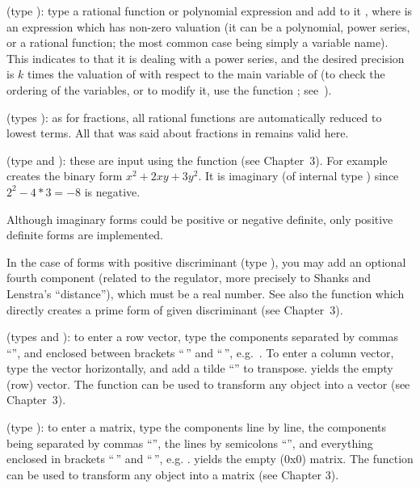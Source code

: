 \label{se:series}
(type ): type a rational function or
polynomial expression and add to it \hbox{},
where  is an expression which has non-zero valuation (it can be a
polynomial, power series, or a rational function; the most common case being
simply a variable name).
This indicates to  that it is dealing with a power series, and the desired
precision is $k$ times the valuation of  with respect to the
main variable of  (to check the ordering of the variables, or
to modify it, use the function ; see~).

(types ): as for fractions, all rational
functions are automatically reduced to lowest terms. All that was
said about fractions in  remains valid here.

%
(type  and ):
these are input using the function  (see Chapter~3). For example
 creates the binary form $x^2+2xy+3y^2$. It is imaginary (of
internal type ) since $2^2 - 4*3 = -8$ is negative.

Although imaginary forms could be positive or negative definite, only
positive definite forms are implemented.

In the case of forms with positive discriminant (type ), you may add
an optional fourth component (related to the regulator, more precisely to
Shanks and Lenstra's ``distance''), which must be a real number. See also the
function  which directly creates a prime form of given
discriminant (see Chapter~3).

 (types
 and ): to enter a row vector, type the components
separated by commas ``\kbd{,}'', and enclosed between brackets
``\kbd{[}$\,$'' and ``$\,$\kbd{]}'', e.g.~\kbd{[1,2,3]}. To enter a column
vector, type the vector horizontally, and add a tilde ``\til'' to transpose.
\kbd{[ ]} yields the empty (row) vector. The function  can be used
to transform any object into a vector (see Chapter~3).

 (type ): to enter a matrix, type
the components line by line, the components being separated by commas
``\kbd{,}'', the lines by semicolons ``\kbd{;}'', and everything enclosed in
brackets ``\kbd{[}$\,$'' and ``$\,$\kbd{]}'', e.g. \kbd{[x,y; z,t; u,v]}.
\kbd{[ ; ]} yields the empty (0x0) matrix. The function  can be used
to transform any object into a matrix (see Chapter 3).

